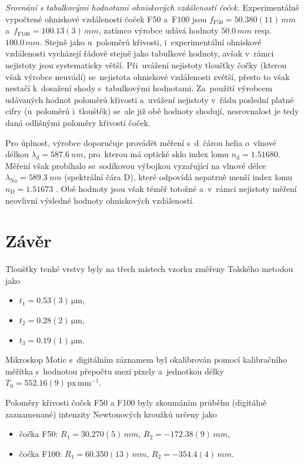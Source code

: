 \documentclass{../concepts/titul_protokol_p/prepareprotokol} %
\begin{document}
\textit{Srovnání s tabulkovými hodnotami ohniskových vzdáleností čoček.}
Experimentálně vypočtené ohniskové vzdálenosti čoček F50 a~F100 jsou $f_{\text{F50}} = 50.380(11) \,\unit{mm}$ 
a~$f_{\text{F100}} = 100.13(3) \,\unit{mm}$, zatímco výrobce udává hodnoty $50.0\,\unit{mm}$ resp. $100.0\,\unit{mm}$.
Stejně jako u~poloměrů křivosti, i~experimentální ohniskové vzdálenosti vycházejí řádově stejně jako tabulkové
hodnoty, avšak v~rámci nejistoty jsou systematicky větší. Při~uvážení nejistoty tloušťky čočky (kterou
však výrobce neuvádí) se~nejistota ohniskové vzdálenosti zvětší, přesto to však nestačí k~dosažení
shody s~tabulkovými hodnotami. Za~použití výrobcem udávaných hodnot poloměrů křivosti
a~uvážení nejistoty v~řádu poslední platné cifry (u~poloměrů i~tlouštěk) se~ale již obě hodnoty shodují,
nesrovnalost je tedy daná odlišnými poloměry křivosti čoček.

Pro úplnost, výrobce doporučuje provádět měření s~d~čárou helia o~vlnové délkou $\lambda_d = \qty{587.6}{nm}$, pro~kterou
má optické sklo index lomu $n_\mathrm{d} = 1.51680$. Měření však probíhalo se~sodíkovou výbojkou
vyzařující na vlnové délce $\lambda_\mathrm{Na} = \qty{589.3}{nm}$ \cite{vlnovedelky} (spektrální čára D), 
které odpovídá nepatrně menší index lomu $n_\mathrm{D} = 1.51673$ \cite{schott}. Obě hodnoty jsou však
téměř totožné a~v~rámci nejistoty měření neovlivní výsledné hodnoty ohniskových vzdáleností.

\section{Závěr}

Tloušťky tenké vrstvy byly na třech místech vzorku změřeny Tolského metodou jako
\begin{itemize}
    \item $t_1 = 0.53(3) \,\unit{\micro\meter}$,
    \item $t_2 = 0.28(2) \,\unit{\micro\meter}$,
    \item $t_3 = 0.19(1) \,\unit{\micro\meter}$.
\end{itemize}

Mikroskop Motic s~digitálním záznamem byl okalibrován pomocí kalibračního měřítka s~hodnotou přepočtu
mezi pixely a~jednotkou délky $T_0 = 552.16(9) \, \mathrm{px \, mm^{-1}}$.

\vspace{2mm}
Poloměry křivosti čoček F50 a F100 byly zkoumáním průběhu (digitálně zaznamenané) intenzity 
Newtonových kroužků určeny jako
\vspace{-1mm}
\begin{itemize}
    \item čočka F50: $R_1 = 30.270(5) \,\unit{mm}$, $R_2 = -172.38(9) \,\unit{mm}$,
    \item čočka F100: $R_1 = 60.350(13) \,\unit{mm}$, $R_2 = -354.4(4) \,\unit{mm}$.
\end{itemize}
\end{document}

